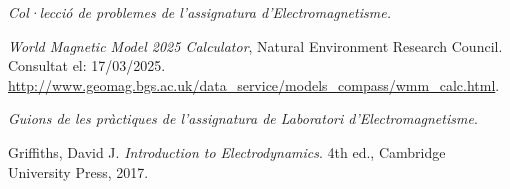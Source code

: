 \documentclass[a4paper,10.5pt]{report}
\begin{document}
\begin{thebibliography}{99}
	\textit{Col·lecció de problemes de l'assignatura d'Electromagnetisme.}
	
	\textit{World Magnetic Model 2025 Calculator}, Natural Environment Research Council. Consultat el: 17/03/2025.\\ 
	\url{http://www.geomag.bgs.ac.uk/data_service/models_compass/wmm_calc.html}.
	
	\textit{Guions de les pràctiques de l'assignatura de Laboratori d'Electromagnetisme}.
	
	Griffiths, David J. \textit{Introduction to Electrodynamics}. 4th ed., Cambridge University Press, 2017.
\end{thebibliography}

\newpage
\end{document}
